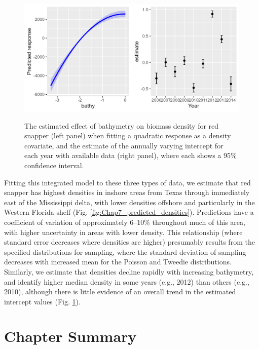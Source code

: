 \begin{figure}[!ht]
    \caption[Estimated covariate responses from an integrated model]{The estimated effect of bathymetry on biomass density for red snapper (left panel) when fitting a quadratic response as a density covariate, and the estimate of the annually varying intercept for each year with available data (right panel), where each shows a 95\% confidence interval.}
    \centering
    \includegraphics[width=5.5in]{Chap_7/covariate_response.png}
    \label{fig:Chap7_covariate_response}
\end{figure}

Fitting this integrated model to these three types of data, we estimate that red snapper has highest densities in inshore areas from Texas through immediately east of the Mississippi delta, with lower densities offshore and particularly in the Western Florida shelf (Fig. \ref{fig:Chap7_predicted_densities}).  Predictions have a coefficient of variation of approximately 6--10\% throughout much of this area, with higher uncertainty in areas with lower density.  This relationship (where standard error decreases where densities are higher) presumably results from the specified distributions for sampling, where the standard deviation of sampling decreases with increased mean for the Poisson and Tweedie distributions.  Similarly, we estimate that densities decline rapidly with increasing bathymetry, and identify higher median density in some years (e.g., 2012) than others (e.g., 2010), although there is little evidence of an overall trend in the estimated intercept values (Fig. \ref{fig:Chap7_covariate_response}).    

\section{Chapter Summary}

